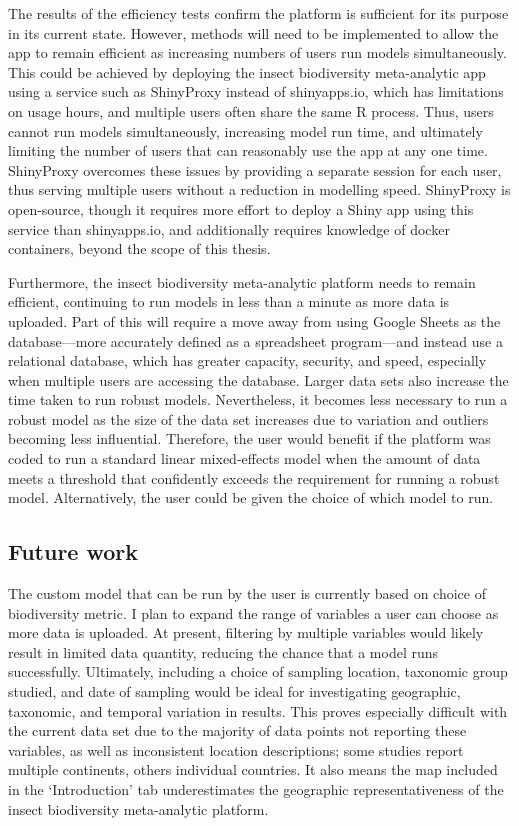 \documentclass[11pt]{article}
\begin{document}
		\noindent The results of the efficiency tests confirm the platform is sufficient for its purpose in its current state. However, methods will need to be implemented to allow the app to remain efficient as increasing numbers of users run models simultaneously. This could be achieved by deploying the insect biodiversity meta-analytic app using a service such as ShinyProxy \citep{open2022shiny} instead of shinyapps.io, which has limitations on usage hours, and multiple users often share the same R process. Thus, users cannot run models simultaneously, increasing model run time, and ultimately limiting the number of users that can reasonably use the app at any one time. ShinyProxy overcomes these issues by providing a separate session for each user, thus serving multiple users without a reduction in modelling speed. ShinyProxy is open-source, though it requires more effort to deploy a Shiny app using this service than shinyapps.io, and additionally requires knowledge of docker containers, beyond the scope of this thesis.
		
		\noindent Furthermore, the insect biodiversity meta-analytic platform needs to remain efficient, continuing to run models in less than a minute as more data is uploaded. Part of this will require a move away from using Google Sheets as the database—more accurately defined as a spreadsheet program—and instead use a relational database, which has greater capacity, security, and speed, especially when multiple users are accessing the database. Larger data sets also increase the time taken to run robust models. Nevertheless, it becomes less necessary to run a robust model as the size of the data set increases due to variation and outliers becoming less influential. Therefore, the user would benefit if the platform was coded to run a standard linear mixed-effects model when the amount of data meets a threshold that confidently exceeds the requirement for running a robust model. Alternatively, the user could be given the choice of which model to run.  
		
		\subsection{Future work}
		The custom model that can be run by the user is currently based on choice of biodiversity metric. I plan to expand the range of variables a user can choose as more data is uploaded. At present, filtering by multiple variables would likely result in limited data quantity, reducing the chance that a model runs successfully. Ultimately, including a choice of sampling location, taxonomic group studied, and date of sampling would be ideal for investigating geographic, taxonomic, and temporal variation in results. This proves especially difficult with the current data set due to the majority of data points not reporting these variables, as well as inconsistent location descriptions; some studies report multiple continents, others individual countries. It also means the map included in the ‘Introduction’ tab underestimates the geographic representativeness of the insect biodiversity meta-analytic platform. 
		
\end{document}
